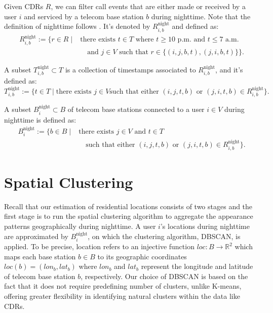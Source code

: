 \begin{definition}
Given CDRs $R$, we can filter call events that are either made or received by a user $i$ and serviced by a telecom base station $b$ during nighttime. Note that the definition of nighttime follows \cite{referral_effect_2023aer}. It's denoted by $R^{\text{night}}_{i, b}$ and defined as:
\begin{align*}
R^{\text{night}}_{i, b} := \{
    r \in R
    \mid
    &\text{there exists } t \in T \text{ where } t \geq \text{10 p.m.} \text{ and } t \leq \text{7 a.m.} \\
    &\quad \text{and } j \in V \text{ such that } r \in \{(i, j, b, t), (j, i, b, t) \}
 \}.
\end{align*}
\end{definition}

\begin{definition}
A subset $T^{\text{night}}_{i, b} \subset T$ is a collection of timestamps associated to $R^{\text{night}}_{i, b}$, and it's defined as:
$$
T^{\text{night}}_{i, b} :=
\{
    t \in T
    \mid
    \text{there exists } j \in V
    \text{such that either } (i, j, t, b) \text{ or } (j, i, t, b) \in R^{\text{night}}_{i, b}
\}.
$$
\end{definition}

\begin{definition}
A subset $B^{\text{night}}_i \subset B$ of telecom base stations connected to a user $i \in V$ during nighttime is defined as:
\begin{align*}
B^{\text{night}}_i := \{
    b \in B
    \mid
    &\text{there exists } j \in V \text{ and } t \in T \\
    &\quad \text{such that either } (i, j, t, b) \text{ or } (j, i, t, b) \in R^{\text{night}}_{i, b}
\}.
\end{align*}
\end{definition}

\section{Spatial Clustering}
Recall that our estimation of residential locations consists of two stages and the first stage is to run the spatial clustering algorithm to aggregate the appearance patterns geographically during nighttime. A user $i$'s locations during nighttime are approximated by $B^{\text{night}}_i$, on which the clustering algorithm, DBSCAN, is applied. To be precise, location refers to an injective function $loc: B \rightarrow \mathbb{R}^2$ which maps each base station $b \in B$ to its geographic coordinates $loc(b) = (lon_b, lat_b)$ where $lon_b$ and $lat_b$ represent the longitude and latitude of telecom base station $b$, respectively. Our choice of DBSCAN is based on the fact that it does not require predefining number of clusters, unlike K-means, offering greater flexibility in identifying natural clusters within the data like CDRs.

